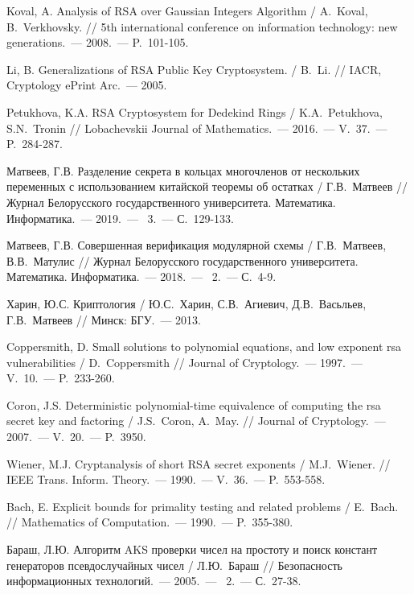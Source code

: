 \documentclass[_00_dissertation.tex]{subfiles}
\begin{document}
\begin{thebibliography}{99}
    Koval, A. Analysis of RSA over Gaussian Integers Algorithm / A.~Koval, B.~Verkhovsky. // 5th international conference on information technology: new generations.~--- 2008.~--- P.~101-105.

    Li, B. Generalizations of RSA Public Key Cryptosystem. / B.~Li. // IACR, Cryptology ePrint Arc.~--- 2005.

    Petukhova, K.A. RSA Cryptosystem for Dedekind Rings / K.A.~Petukhova, S.N.~Tronin // Lobachevskii Journal of Mathematics.~--- 2016.~--- V.~37.~--- P.~284-287.

    Матвеев, Г.В. Разделение секрета в кольцах многочленов от нескольких переменных с использованием китайской теоремы об остатках / Г.В.~Матвеев // Журнал Белорусского государственного университета. Математика. Информатика.~--- 2019.~--- \textnumero~3.~--- С.~129-133.

    Матвеев, Г.В. Совершенная верификация модулярной схемы / Г.В.~Матвеев, В.В.~Матулис // Журнал Белорусского государственного университета. Математика. Информатика.~--- 2018.~--- \textnumero~2.~--- С.~4-9.

    Харин, Ю.С. Криптология / Ю.С.~Харин, С.В.~Агиевич, Д.В.~Васьльев, Г.В.~Матвеев // Минск: БГУ.~--- 2013.

    Coppersmith, D. Small solutions to polynomial equations, and low exponent rsa vulnerabilities / D.~Coppersmith // Journal of Cryptology.~--- 1997.~--- V.~10.~--- P.~233-260.

    Coron, J.S. Deterministic polynomial-time equivalence of computing the rsa secret key and factoring / J.S.~Coron, A.~May. // Journal of Cryptology.~--- 2007.~--- V.~20.~--- P.~3950.

    Wiener, M.J. Cryptanalysis of short RSA secret exponents / M.J.~Wiener. // IEEE Trans. Inform. Theory.~--- 1990.~--- V.~36.~--- P.~553-558.

    Bach, E. Explicit bounds for primality testing and related problems / E.~Bach. // Mathematics of Computation.~--- 1990.~--- P.~355-380.

    Бараш, Л.Ю. Алгоритм AKS проверки чисел на простоту и поиск констант генераторов псевдослучайных чисел / Л.Ю.~Бараш // Безопасность информационных технологий.~--- 2005.~--- \textnumero~2.~--- С.~27-38.


\end{thebibliography}
\end{document}
